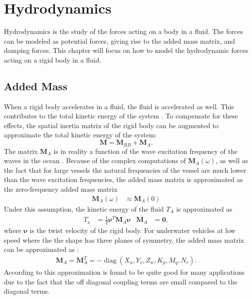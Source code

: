 \section{Hydrodynamics}
\label{sec:hydrodynamics}

Hydrodynamics is the study of the forces acting on a body in a fluid. The forces
can be modeled as potential forces, giving rise to the added mass matrix, and
damping forces. This chapter will focus on how to model the hydrodynamic forces
acting on a rigid body in a fluid.

\subsection{Added Mass}

When a rigid body accelerates in a fluid, the fluid is accelerated as well. 
This contributes to the total kinetic energy of the system \cite{antonelli2018}.
To compensate for these effects, the spatial inertia matrix of the rigid body
can be augmented to approximate the total kinetic energy of the system: 
\begin{equation}
    \bm{M} = \bm{M}_{RB} + \bm{M}_{A}.
\end{equation}
The matrix $\bm{M}_A$ is in reality a function of the wave excitation frequency
of the waves in the ocean \cite{fossen2021}. Because of the complex computations
of $\bm{M}_A(\omega)$, as well as the fact that for large vessels the natural
frequencies of the vessel are much lower than the wave excitation frequencies,
the added mass matrix is approximated as the zero-frequency added mass matrix
\begin{align}
    \bm{M}_A(\omega) &\approx \bm{M}_A(0)
\end{align}
Under this assumption, the kinetic energy of the fluid $T_A$ is approximated
as
\begin{align}
    T_a &= \frac{1}{2}\bm{\nu}^T\bm{M}_A\bm{\nu} & \dot{\bm{M}_A} &= \bm{0},
\end{align}
where $\bm{\nu}$ is the twist velocity of the rigid body. For underwater 
vehicles at low speed where the the shape has three planes of symmetry, the
added mass matrix can be approximated as \cite{fossen2021}:
\begin{align}
    \bm{M}_A = \bm{M}_A^T =
    -\operatorname{diag}(X_{\dot{u}}, Y_{\dot{v}}, Z_{\dot{w}},
        K_{\dot{p}}, M_{\dot{q}}, N_{\dot{r}}).
\end{align}
According to \cite{fossen2021} this approximation is found to be quite good for
many applications due to the fact that the off diagonal coupling terms are small
compared to the diagonal terms.

